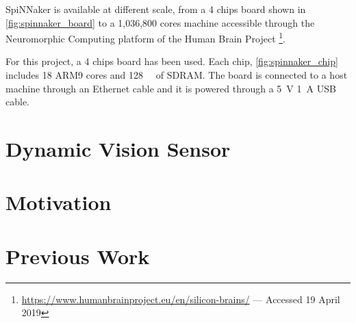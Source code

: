 SpiNNaker is available at different scale, from a 4 chips board shown in \cref{fig:spinnaker_board} to a 1,036,800 cores machine accessible through the Neuromorphic Computing platform of the Human Brain Project \footnote{\url{https://www.humanbrainproject.eu/en/silicon-brains/} --- Accessed 19 April 2019}.

For this project, a 4 chips board has been used. Each chip, \cref{fig:spinnaker_chip} includes 18 ARM9 cores and \SI{128}{\mega\byte} of SDRAM. The board is connected to a host machine through an Ethernet cable and it is powered through a \SI{5}{\volt} \SI{1}{\ampere} USB cable.

\section{Dynamic Vision Sensor}


\section{Motivation}


\section{Previous Work}
